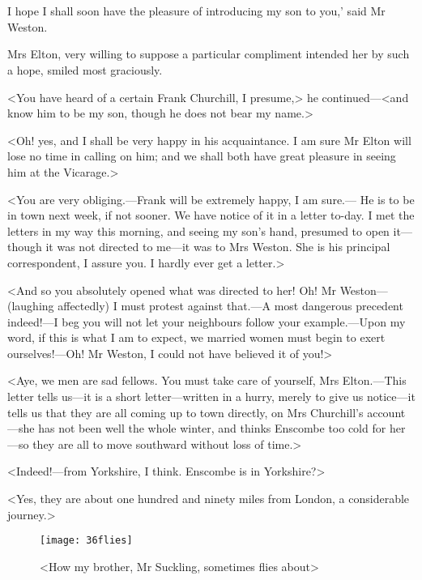 \chapter[Chapter \thechapter]{}
	
\lettrine[lraise=0.3,ante=`]{I}{} hope I shall soon have the pleasure of introducing my son to you,' said Mr Weston.

\zz
Mrs Elton, very willing to suppose a particular compliment intended her by such a hope, smiled most graciously.

<You have heard of a certain Frank Churchill, I presume,> he continued—<and know him to be my son, though he does not bear my name.>

<Oh! yes, and I shall be very happy in his acquaintance. I am sure Mr Elton will lose no time in calling on him; and we shall both have great pleasure in seeing him at the Vicarage.>

<You are very obliging.—Frank will be extremely happy, I am sure.— He is to be in town next week, if not sooner. We have notice of it in a letter to-day. I met the letters in my way this morning, and seeing my son's hand, presumed to open it—though it was not directed to me—it was to Mrs Weston. She is his principal correspondent, I assure you. I hardly ever get a letter.>

<And so you absolutely opened what was directed to her! Oh! Mr Weston—(laughing affectedly) I must protest against that.—A most dangerous precedent indeed!—I beg you will not let your neighbours follow your example.—Upon my word, if this is what I am to expect, we married women must begin to exert ourselves!—Oh! Mr Weston, I could not have believed it of you!>

<Aye, we men are sad fellows. You must take care of yourself, Mrs Elton.—This letter tells us—it is a short letter—written in a hurry, merely to give us notice—it tells us that they are all coming up to town directly, on Mrs Churchill's account—she has not been well the whole winter, and thinks Enscombe too cold for her—so they are all to move southward without loss of time.>

<Indeed!—from Yorkshire, I think. Enscombe is in Yorkshire?>

<Yes, they are about one hundred and ninety miles from London, a considerable journey.>

\begin{figure}[tbph]
\centering
\texttt{[image: 36flies]}
\caption{<How my brother, Mr Suckling, sometimes flies about>}
\end{figure}

